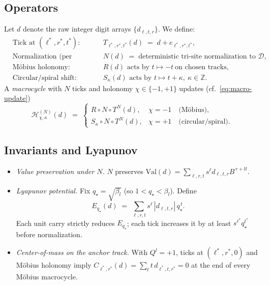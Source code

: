 \documentclass[11pt]{article}
\theoremstyle{definition}
\theoremstyle{remark}
\newcommand{\Z}{\mathbb{Z}}
\newcommand{\Val}{\mathrm{Val}}
\begin{document}
\subsection*{Operators}
Let $d$ denote the raw integer digit arrays $\{d_{\ell,t,r}\}$. We define:
\begin{align}
  &\text{Tick at }(\ell^{*},r^{*},t^{*}): && T_{\ell^{*},r^{*},t^{*}}(d)\;=\;d+e_{\ell^{*},r^{*},t^{*}},\\
  &\text{Normalization (per track):} && N(d)\;=\;\text{deterministic tri-site normalization to }\mathcal D,\\
  &\text{M\"obius holonomy:} && R(d) \text{ acts by } t\mapsto -t\ \text{on chosen tracks},\\
  &\text{Circular/spiral shift:} && S_\kappa(d) \text{ acts by } t\mapsto t+\kappa,\ \kappa\in\Z.
\end{align}
A \emph{macrocycle} with $N$ ticks and holonomy $\chi\in\{-1,+1\}$ updates (cf.\ \eqref{eq:macro-update})
\begin{equation*}
  \mathcal H_{\chi,\kappa}^{(N)}(d)\;=\;
  \begin{cases}
    R\!\circ N\!\circ T^{N}(d), & \chi=-1\quad\text{(M\"obius)},\\[2pt]
    S_\kappa\!\circ N\!\circ T^{N}(d), & \chi=+1\quad\text{(circular/spiral)}.
  \end{cases}
\end{equation*}

\subsection*{Invariants and Lyapunov}
\begin{itemize}
  \item \emph{Value preservation under $N$.} $N$ preserves $\Val(d)=\sum_{\ell,r,t} s^\ell d_{\ell,t,r}B^{\,r+lt}$.
  \item \emph{Lyapunov potential.} Fix $q_\star=\sqrt{\beta_l}$ (so $1<q_\star<\beta_l$). Define
  \begin{equation}
  E_{q_\star}(d)\;=\;\sum_{\ell,r,t} s^\ell\,|d_{\ell,t,r}|\,q_\star^{\,t}.
  \end{equation}
  Each unit carry strictly reduces $E_{q_\star}$; each tick increases it by at least $s^{\ell^{*}}q_\star^{t^{*}}$ before normalization.
  \item \emph{Center-of-mass on the anchor track.} With $Q^l=+1$, ticks at $(\ell^{*},r^{*},0)$ and M\"obius holonomy imply
  $C_{\ell^{*},r^{*}}(d)=\sum_t t\,d_{\ell^{*},t,r^{*}}=0$ at the end of every M\"obius macrocycle.
\end{itemize}
\end{document}
